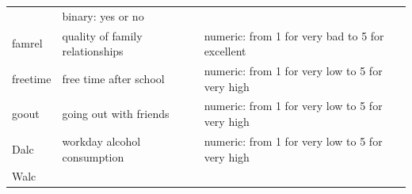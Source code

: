 \documentclass[]{article}
\begin{document}
\begin{longtable}[]{@{}lll@{}}
\begin{minipage}[t]{0.28\columnwidth}
\end{minipage} & \begin{minipage}[t]{0.58\columnwidth}\raggedright
binary: yes or no\strut
\end{minipage}\tabularnewline
\begin{minipage}[t]{0.05\columnwidth}\raggedright
famrel\strut
\end{minipage} & \begin{minipage}[t]{0.28\columnwidth}\raggedright
quality of family relationships\strut
\end{minipage} & \begin{minipage}[t]{0.58\columnwidth}\raggedright
numeric: from 1 for very bad to 5 for excellent\strut
\end{minipage}\tabularnewline
\begin{minipage}[t]{0.05\columnwidth}\raggedright
freetime\strut
\end{minipage} & \begin{minipage}[t]{0.28\columnwidth}\raggedright
free time after school\strut
\end{minipage} & \begin{minipage}[t]{0.58\columnwidth}\raggedright
numeric: from 1 for very low to 5 for very high\strut
\end{minipage}\tabularnewline
\begin{minipage}[t]{0.05\columnwidth}\raggedright
goout\strut
\end{minipage} & \begin{minipage}[t]{0.28\columnwidth}\raggedright
going out with friends\strut
\end{minipage} & \begin{minipage}[t]{0.58\columnwidth}\raggedright
numeric: from 1 for very low to 5 for very high\strut
\end{minipage}\tabularnewline
\begin{minipage}[t]{0.05\columnwidth}\raggedright
Dalc\strut
\end{minipage} & \begin{minipage}[t]{0.28\columnwidth}\raggedright
workday alcohol consumption\strut
\end{minipage} & \begin{minipage}[t]{0.58\columnwidth}\raggedright
numeric: from 1 for very low to 5 for very high\strut
\end{minipage}\tabularnewline
\begin{minipage}[t]{0.05\columnwidth}\raggedright
Walc\strut
\end{minipage} & \begin{minipage}[t]{0.28\columnwidth}\raggedright

\end{minipage}
\end{longtable}
\end{document}
